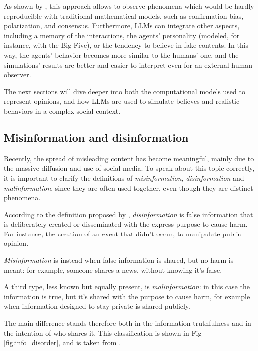 \medskip
As shown by \citet{chuang2024simulatingopiniondynamicsnetworks, cau2025languagedrivenopiniondynamicsagentbased, piao2025emergencehumanlikepolarizationlarge}, this approach allows to observe phenomena which would be hardly reproducible with traditional mathematical models, such as confirmation bias, polarization, and consensus.
Furthermore, LLMs can integrate other aspects, including a memory of the interactions, the agents' personality (modeled, for instance, with the Big Five), or the tendency to believe in fake contents.
In this way, the agents' behavior becomes more similar to the humans' one, and the simulations' results are better and easier to interpret even for an external human observer.

\medskip
The next sections will dive deeper into both the computational models used to represent opinions, and how LLMs are used to simulate believes and realistic behaviors in a complex social context.





\subsection{Misinformation and disinformation} %
Recently, the spread of misleading content has become meaningful, mainly due to the massive diffusion and use of social media.
To speak about this topic correctly, it is important to clarify the definitions of \textit{misinformation}, \textit{disinformation} and \textit{malinformation}, since they are often used together, even though they are distinct phenomena.


According to the definition proposed by \citet{wardle2017information, wardle2017information}, \textit{disinformation} is false information that is deliberately created or disseminated with the express purpose to cause harm.
For instance, the creation of an event that didn't occur, to manipulate public opinion.

\textit{Misinformation} is instead when false information is shared, but no harm is meant: for example, someone shares a news, without knowing it's false.

A third type, less known but equally present, is \textit{malinformation}: in this case the information is true, but it's shared with the purpose to cause harm, for example when information designed to stay private is shared publicly.

The main difference stands therefore both in the information truthfulness and in the intention of who shares it. This classification is shown in Fig \ref{fig:info_disorder}, and is taken from \cite{wardle2017information}.

